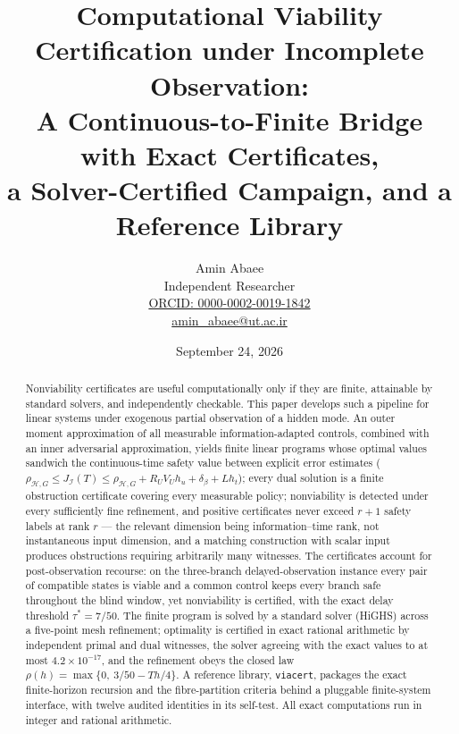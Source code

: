 \documentclass[10pt,twocolumn]{article}
\theoremstyle{plain}
\theoremstyle{definition}
\theoremstyle{remark}
\begin{document}
\title{Computational Viability Certification under Incomplete Observation:\\
A Continuous-to-Finite Bridge with Exact Certificates,\\
a Solver-Certified Campaign, and a Reference Library}
\newcommand{\edition}{2}
\author{Amin Abaee\\[0.35em]
{\small Independent Researcher}\\[0.55em]
{\small\href{https://orcid.org/0000-0002-0019-1842}{ORCID: 0000-0002-0019-1842}}\\[0.3em]
{\small\href{mailto:amin\_abaee@ut.ac.ir}{amin\_abaee@ut.ac.ir}}}
\date{September 24, 2026}
\maketitle

\begin{abstract}
Nonviability certificates are useful computationally only if they are finite,
attainable by standard solvers, and independently checkable. This paper
develops such a pipeline for linear systems under exogenous partial
observation of a hidden mode. An outer moment approximation of all measurable
information-adapted controls, combined with an inner adversarial approximation,
yields finite linear programs whose optimal values sandwich the
continuous-time safety value between explicit error estimates
(\(\rho_{\mathcal{H},G} \le J_{\mathcal{I}}(T) \le \rho_{\mathcal{H},G} +
R_U V_U h_u + \delta_\beta + L h_t\)); every dual solution is a finite
obstruction certificate covering every measurable policy; nonviability is
detected under every sufficiently fine refinement, and positive certificates
never exceed \(r + 1\) safety labels at rank \(r\) --- the relevant dimension
being information--time rank, not instantaneous input dimension, and a
matching construction with scalar input produces obstructions requiring
arbitrarily many witnesses. The certificates account for post-observation
recourse: on the three-branch delayed-observation instance every pair of
compatible states is viable and a common control keeps every branch safe
throughout the blind window, yet nonviability is certified, with the exact
delay threshold \(\tau^{*} = 7/50\). The finite program is solved by a
standard solver (HiGHS) across a five-point mesh refinement; optimality is
certified in exact rational arithmetic by independent primal and dual
witnesses, the solver agreeing with the exact values to at most
\(4.2 \times 10^{-17}\), and the refinement obeys the closed law
\(\rho(h) = \max\{0,\ 3/50 - Th/4\}\). A reference library,
\texttt{viacert}, packages the exact finite-horizon recursion and the
fibre-partition criteria behind a pluggable finite-system interface, with
twelve audited identities in its self-test. All exact computations run in
integer and rational arithmetic.
\end{abstract}
\end{document}
